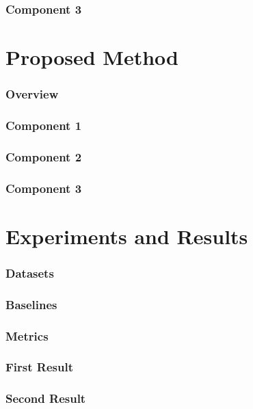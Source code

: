 \documentclass[aspectratio=169]{beamer}
\begin{document}
\begin{frame}
	\frametitle{Component 3}
	
\end{frame}


\section{Proposed Method}

\begin{frame}
\frametitle{Overview}

\end{frame}


\begin{frame}
\frametitle{Component 1}

\end{frame}

\begin{frame}
\frametitle{Component 2}

\end{frame}

\begin{frame}
\frametitle{Component 3}

\end{frame}

\section{Experiments and Results}
\begin{frame}
\frametitle{Datasets}

\end{frame}

\begin{frame}
\frametitle{Baselines}


\end{frame}

\begin{frame}
\frametitle{Metrics}

\end{frame}

\begin{frame}
\frametitle{First Result}

\end{frame}

\begin{frame}
\frametitle{Second Result}

\end{frame}
\end{document}
